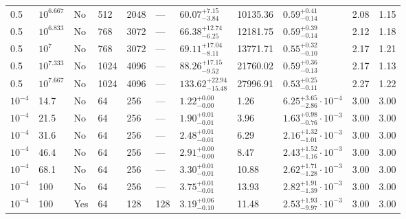 \documentclass[aps, prfluids, onecolumn, notitlepage, nofootinbib, groupedaddress, amsfonts, amssymb, amsmath]{revtex4-1}
\begin{document}
\begin{center}
\begin{longtable}{ p{1cm} p{1cm} p{1cm} p{1cm} p{1cm} p{1cm} p{1.75cm} p{1.5cm} p{2.75cm} p{1cm} p{1.2cm}  }
\vspace{0.08cm}0.5	&	$10^{6.667}$	&	No	&	512	&	2048	&	---	&$	60.07	_{-	3.84	}^{+	7.15	}$&	10135.36	&$	0.59	_{-	0.14	}^{+	0.41	}$&	2.08	&	1.15	\\
\vspace{0.08cm}0.5	&	$10^{6.833}$	&	No	&	768	&	3072	&	---	&$	66.38	_{-	6.25	}^{+	12.74	}$&	12181.75	&$	0.59	_{-	0.14	}^{+	0.39	}$&	2.12	&	1.18	\\
\vspace{0.08cm}0.5	&	$10^7$	&	No	&	768	&	3072	&	---	&$	69.11	_{-	8.11	}^{+	17.04	}$&	13771.71	&$	0.55	_{-	0.10	}^{+	0.32	}$&	2.17	&	1.21	\\
\vspace{0.08cm}0.5	&	$10^{7.333}$	&	No	&	1024	&	4096	&	---	&$	88.26	_{-	9.52	}^{+	17.15	}$&	21760.02	&$	0.59	_{-	0.13	}^{+	0.36	}$&	2.17	&	1.13	\\
\vspace{0.08cm}0.5	&	$10^{7.667}$	&	No	&	1024	&	4096	&	---	&$	133.62	_{-	15.48	}^{+	22.94	}$&	27996.91	&$	0.53	_{-	0.11	}^{+	0.25	}$&	2.27	&	1.22	\\
\vspace{0.08cm}$10^{-4}$	&	14.7	&	No	&	64	&	256	&	---	&$	1.22	_{-	0.00	}^{+	0.00	}$&	1.26	&$	6.25	_{-	2.86	}^{+	3.65}\cdot 10^{-4}	$&	3.00	&	3.00	\\
\vspace{0.08cm}$10^{-4}$	&	21.5	&	No	&	64	&	256	&	---	&$	1.90	_{-	0.01	}^{+	0.01	}$&	3.96	&$	1.63	_{-	0.76	}^{+	0.98}\cdot 10^{-3}	$&	3.00	&	3.00	\\
\vspace{0.08cm}$10^{-4}$	&	31.6	&	No	&	64	&	256	&	---	&$	2.48	_{-	0.01	}^{+	0.01	}$&	6.29	&$	2.16	_{-	1.01	}^{+	1.32}\cdot 10^{-3}	$&	3.00	&	3.00	\\
\vspace{0.08cm}$10^{-4}$	&	46.4	&	No	&	64	&	256	&	---	&$	2.91	_{-	0.00	}^{+	0.00	}$&	8.47	&$	2.43	_{-	1.16	}^{+	1.52}\cdot 10^{-3}	$&	3.00	&	3.00	\\
\vspace{0.08cm}$10^{-4}$	&	68.1	&	No	&	64	&	256	&	---	&$	3.30	_{-	0.01	}^{+	0.01	}$&	10.88	&$	2.62	_{-	1.28	}^{+	1.71}\cdot 10^{-3}	$&	3.00	&	3.00	\\
\vspace{0.08cm}$10^{-4}$	&	100	&	No	&	64	&	256	&	---	&$	3.75	_{-	0.01	}^{+	0.01	}$&	13.93	&$	2.82	_{-	1.39	}^{+	1.91}\cdot 10^{-3}	$&	3.00	&	3.00	\\
\vspace{0.08cm}$10^{-4}$	&	100	&	Yes	&	64	&	128	&	128	&$	3.19	_{-	0.10	}^{+	0.06	}$&	11.48	&$	2.53	_{-	9.97	}^{+	1.93}\cdot 10^{-3}	$&	3.00	&	3.00	\\

\end{longtable}
\end{center}
\end{document}
